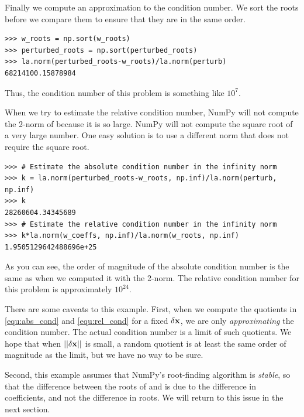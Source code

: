 Finally we compute an approximation to the condition number.
We sort the roots before we compare them to ensure that they are in the same order.
\begin{lstlisting}
>>> w_roots = np.sort(w_roots)
>>> perturbed_roots = np.sort(perturbed_roots)
>>> la.norm(perturbed_roots-w_roots)/la.norm(perturb)
68214100.15878984
\end{lstlisting}
Thus, the condition number of this problem is something like $10^7$.

When we try to estimate the relative condition number, NumPy will not compute the 2-norm of  because it is so large.
NumPy will not compute the square root of a very large number.
One easy solution is to use a different norm that does not require the square root.
\begin{lstlisting}
>>> # Estimate the absolute condition number in the infinity norm
>>> k = la.norm(perturbed_roots-w_roots, np.inf)/la.norm(perturb, np.inf)
>>> k
28260604.34345689
>>> # Estimate the relative condition number in the infinity norm
>>> k*la.norm(w_coeffs, np.inf)/la.norm(w_roots, np.inf)
1.9505129642488696e+25
\end{lstlisting}
As you can see, the order of magnitude of the absolute condition number is the same as when we computed it with the 2-norm.
The relative condition number for this problem is approximately $10^{24}$.


There are some caveats to this example.
First, when we compute the quotients in \eqref{equ:abs_cond} and \eqref{equ:rel_cond} for a fixed $\delta {\bf x}$, we are only \emph{approximating} the condition number.
The actual condition number is a limit of such quotients.
We hope that when $||\delta {\bf x}||$ is small, a random quotient is at least the same order of magnitude as the limit, but we have no way to be sure.

Second, this example assumes that NumPy's root-finding algorithm is \emph{stable}, so that the difference between the roots of  and  is due to the difference in coefficients, and not the difference in roots.
We will return to this issue in the next section.


